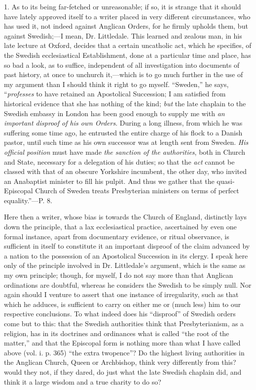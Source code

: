 1. As to its being far-fetched or unreasonable; if so, it is
strange that it should have lately approved itself to a writer placed
in very different circumstances, who has used it, not indeed against
Anglican Orders, for he firmly upholds them, but against Swedish;—I
mean, Dr. Littledale. This learned and zealous man, in his late
lecture at Oxford, decides that a certain uncatholic act, which he
specifies, of the Swedish ecclesiastical Establishment, done at a
particular time and place, has so bad a look, as to suffice,
independent of all investigation into documents of past history, at
once to unchurch it,—which is to go much further in the use of my
argument than I should think it right to go myself.
``Sweden,'' he says, ``\emph{professes} to have retained
an Apostolical Succession; I am satisfied from historical evidence
that she has nothing of the kind; \emph{but} the late chaplain to the
Swedish embassy in London has been good enough to supply me with \emph{an
important disproof of his own Orders}. During a long illness, from
which he was suffering some time ago, he entrusted the entire charge
of his flock to a Danish pastor, until such time as his own successor
was at length sent from Sweden. \emph{His official position} must have
made \emph{the sanction of the authorities}, both in Church and State,
necessary for a delegation of his duties; so that the \emph{act}
cannot be classed with that of an obscure Yorkshire incumbent, the
other day, who invited an Anabaptist minister to fill his pulpit. And
thus we gather that the quasi-Episcopal Church of Sweden treats
Presbyterian ministers on terms of perfect equality.''—P. 8.

Here then a writer, whose bias is towards the Church of England,
distinctly lays down the principle, that a lax ecclesiastical
practice, ascertained by even one formal instance, apart from
documentary evidence, or ritual observance, is sufficient in itself to
constitute it an important disproof of the claim advanced by a nation
to the possession of an Apostolical Succession in its clergy. I speak
here only of the principle involved in Dr. Littledale's argument,
which is the same as my own principle; though, for myself, I do not
say more than that Anglican ordinations are doubtful, whereas he
considers the Swedish to be simply null. Nor again should I venture to
assert that one instance of irregularity, such as that which he
adduces, is sufficient to carry on either me or (much less) him to our
respective conclusions. To what indeed does his ``disproof''
of Swedish orders come but to this: that the Swedish authorities think
that Presbyterianism, as a religion, has in its doctrines and
ordinances what is called ``the root of the matter,'' and that
the Episcopal form is nothing more than what I have called above (vol.
i. p. 365) ``the extra twopence''? Do the highest living
authorities in the Anglican Church, Queen or Archbishop, think very
differently from this? would they not, if they dared, do just what the
late Swedish chaplain did, and think it a large wisdom and a true
charity to do so?

